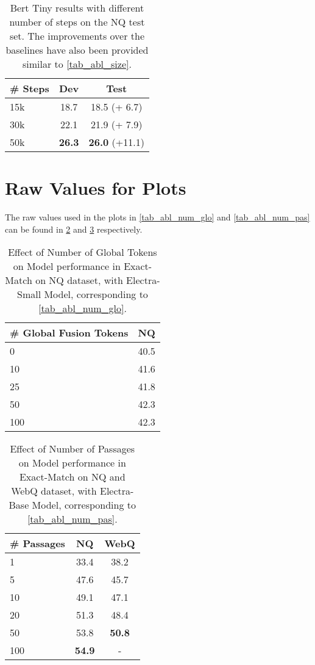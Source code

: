 \documentclass[11pt]{article}
\begin{document}
\begin{table}[h!]
\begin{center}
\begin{tabular}{lcc}
\toprule
\textbf{\# Steps} & \textbf{Dev} & \textbf{Test}\\ 
\toprule
15k  & 18.7 & 18.5 (+ 6.7)\\
30k & 22.1 & 21.9 (+ 7.9) \\
50k & \textbf{26.3} & \textbf{26.0} (+11.1) \\
\bottomrule
\end{tabular}
\end{center}
\caption{Bert Tiny results with different number of steps on the NQ test set. The improvements over the baselines have also been provided similar to \cref{tab_abl_size}.}
\label{tab_bert_tiny_steps}
\end{table}

\section{Raw Values for Plots}

The raw values used in the plots in \cref{tab_abl_num_glo} and \cref{tab_abl_num_pas} can be found in \cref{tab_raw_abl_num_glo} and \cref{tab_raw_abl_num_pas} respectively.

\begin{table}[h!]
\begin{center}
\begin{tabular}{lc}
\toprule
\textbf{\# Global Fusion Tokens} & \textbf{NQ} \\ 
\toprule
0 & 40.5 \\
10 & 41.6 \\
25 & 41.8 \\
50 & 42.3 \\
100 & 42.3 \\
\bottomrule
\end{tabular}
\end{center}
\caption{Effect of Number of Global Tokens on Model performance in Exact-Match on NQ dataset, with Electra-Small Model, corresponding to \cref{tab_abl_num_glo}.}
\label{tab_raw_abl_num_glo}
\end{table}

\begin{table}[h!]
\begin{center}
\begin{tabular}{lcc}
\toprule
\textbf{\# Passages} & \textbf{NQ} & \textbf{WebQ}\\ 
\toprule
1 & 33.4 & 38.2 \\
5 & 47.6 & 45.7 \\
10 & 49.1 & 47.1\\
20 & 51.3 & 48.4 \\
50 & 53.8 &  \textbf{50.8} \\
100 & \textbf{54.9} & - \\
\bottomrule
\end{tabular}
\end{center}
\caption{Effect of Number of Passages on Model performance in Exact-Match on NQ and WebQ dataset, with Electra-Base Model, corresponding to \cref{tab_abl_num_pas}.}
\label{tab_raw_abl_num_pas}
\end{table}
\end{document}
